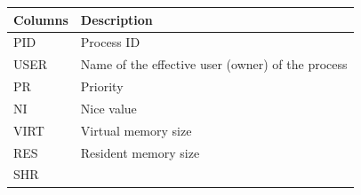 \documentclass[]{book}
\begin{document}
\begin{longtable}[]{@{}ll@{}}
\toprule
\begin{minipage}[b]{0.05\columnwidth}\raggedright
Columns\strut
\end{minipage} & \begin{minipage}[b]{0.89\columnwidth}\raggedright
Description\strut
\end{minipage}\tabularnewline
\midrule
\endhead
\begin{minipage}[t]{0.05\columnwidth}\raggedright
PID\strut
\end{minipage} & \begin{minipage}[t]{0.89\columnwidth}\raggedright
Process ID\strut
\end{minipage}\tabularnewline
\begin{minipage}[t]{0.05\columnwidth}\raggedright
USER\strut
\end{minipage} & \begin{minipage}[t]{0.89\columnwidth}\raggedright
Name of the effective user (owner) of the process\strut
\end{minipage}\tabularnewline
\begin{minipage}[t]{0.05\columnwidth}\raggedright
PR\strut
\end{minipage} & \begin{minipage}[t]{0.89\columnwidth}\raggedright
Priority\strut
\end{minipage}\tabularnewline
\begin{minipage}[t]{0.05\columnwidth}\raggedright
NI\strut
\end{minipage} & \begin{minipage}[t]{0.89\columnwidth}\raggedright
Nice value\strut
\end{minipage}\tabularnewline
\begin{minipage}[t]{0.05\columnwidth}\raggedright
VIRT\strut
\end{minipage} & \begin{minipage}[t]{0.89\columnwidth}\raggedright
Virtual memory size\strut
\end{minipage}\tabularnewline
\begin{minipage}[t]{0.05\columnwidth}\raggedright
RES\strut
\end{minipage} & \begin{minipage}[t]{0.89\columnwidth}\raggedright
Resident memory size\strut
\end{minipage}\tabularnewline
\begin{minipage}[t]{0.05\columnwidth}\raggedright
SHR\strut
\end{minipage} & \begin{minipage}[t]{0.89\columnwidth}\raggedright

\end{minipage}
\end{longtable}
\end{document}
